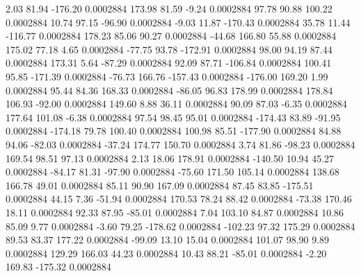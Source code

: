         2.03       81.94     -176.20     0.0002884
      173.98       81.59       -9.24     0.0002884
       97.78       90.88      100.22     0.0002884
       10.74       97.15      -96.90     0.0002884
       -9.03       11.87     -170.43     0.0002884
       35.78       11.44     -116.77     0.0002884
      178.23       85.06       90.27     0.0002884
      -44.68      166.80       55.88     0.0002884
      175.02       77.18        4.65     0.0002884
      -77.75       93.78     -172.91     0.0002884
       98.00       94.19       87.44     0.0002884
      173.31        5.64      -87.29     0.0002884
       92.09       87.71     -106.84     0.0002884
      100.41       95.85     -171.39     0.0002884
      -76.73      166.76     -157.43     0.0002884
     -176.00      169.20        1.99     0.0002884
       95.44       84.36      168.33     0.0002884
      -86.05       96.83      178.99     0.0002884
      178.84      106.93      -92.00     0.0002884
      149.60        8.88       36.11     0.0002884
       90.09       87.03       -6.35     0.0002884
      177.64      101.08       -6.38     0.0002884
       97.54       98.45       95.01     0.0002884
     -174.43       83.89      -91.95     0.0002884
     -174.18       79.78      100.40     0.0002884
      100.98       85.51     -177.90     0.0002884
       84.88       94.06      -82.03     0.0002884
      -37.24      174.77      150.70     0.0002884
        3.74       81.86      -98.23     0.0002884
      169.54       98.51       97.13     0.0002884
        2.13       18.06      178.91     0.0002884
     -140.50       10.94       45.27     0.0002884
      -84.17       81.31      -97.90     0.0002884
      -75.60      171.50      105.14     0.0002884
      138.68      166.78       49.01     0.0002884
       85.11       90.90      167.09     0.0002884
       87.45       83.85     -175.51     0.0002884
       44.15        7.36      -51.94     0.0002884
      170.53       78.24       88.42     0.0002884
      -73.38      170.46       18.11     0.0002884
       92.33       87.95      -85.01     0.0002884
        7.04      103.10       84.87     0.0002884
       10.86       85.09        9.77     0.0002884
       -3.60       79.25     -178.62     0.0002884
     -102.23       97.32      175.29     0.0002884
       89.53       83.37      177.22     0.0002884
      -99.09       13.10       15.04     0.0002884
      101.07       98.90        9.89     0.0002884
      129.29      166.03       44.23     0.0002884
       10.43       88.21      -85.01     0.0002884
       -2.20      169.83     -175.32     0.0002884
